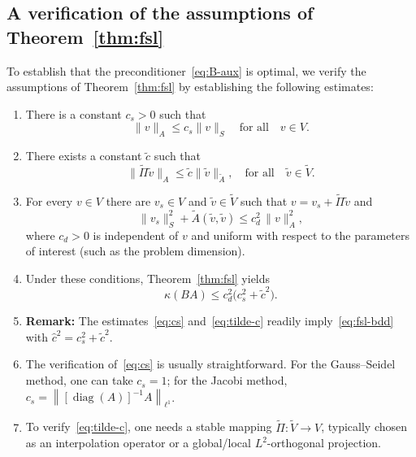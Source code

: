 \documentclass[11pt]{article}
\theoremstyle{remark}
\begin{document}
\subsection{A verification of the assumptions of Theorem~\ref{thm:fsl}} 
To establish that the preconditioner~\eqref{eq:B-aux} is optimal, we verify the assumptions of Theorem~\ref{thm:fsl} by establishing the following estimates:
\begin{enumerate}[{\bf {\thesubsection}.1.}]
  \item There is a constant $c_s > 0$ such that
    \begin{equation}\label{eq:cs}
      \|v\|_A \le c_s \|v\|_S \quad \mbox{for all}\quad v \in V.
    \end{equation}
  \item There exists a constant $\widetilde{c}$ such that 
    \begin{equation}\label{eq:tilde-c}
      \|\widetilde\Pi \widetilde{v}\|_A 
      \le \widetilde{c}\|\widetilde{v}\|_{\widetilde{A}},
      \quad \mbox{for all} \quad \widetilde{v} \in \widetilde{V}.
    \end{equation}
  \item For every  $v \in V$ there are $v_s \in V$ and
    $\widetilde{v} \in \widetilde{V}$ such that $v = v_s + \widetilde{\Pi}\widetilde{v}$ and
    \begin{equation}\label{eq:stable-decomp}
      \|v_s\|_S^2 + \widetilde{A}(\widetilde{v},\widetilde{v})
      \le c_d^2\,\|v\|_A^2,
    \end{equation}
    where $c_d > 0$ is independent of $v$ and uniform with respect to the parameters of interest (such as the problem dimension).
\item Under these conditions, Theorem~\ref{thm:fsl} yields
\begin{equation}
  \label{eq:cond-aux}
  \kappa(BA) \le c_d^2\bigl(c_s^2 + \widetilde{c}^2\bigr).
\end{equation}
\item {\bf Remark:} The estimates~\eqref{eq:cs} and~\eqref{eq:tilde-c} readily imply~\eqref{eq:fsl-bdd} with $\widehat{c}^2 = c_s^2 + \widetilde{c}^2$.
\item The verification of~\eqref{eq:cs} is usually straightforward. For the Gauss--Seidel method, one can take $c_s = 1$; for the Jacobi method, $c_s = \left\|[\operatorname{diag}(A)]^{-1}A\right\|_{\ell^1}$.
\item To verify~\eqref{eq:tilde-c}, one needs a stable mapping $\widetilde\Pi : \widetilde{V} \to V$, typically chosen as an interpolation operator or a global/local $L^2$-orthogonal projection.

\end{enumerate}
\end{document}
